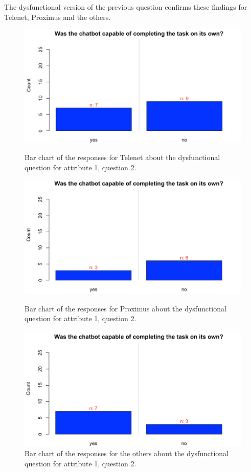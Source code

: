 The dysfunctional version of the previous question confirms these findings for Telenet, Proximus and the others.\\
\begin{figure}[!htb]
	\includegraphics[width=\linewidth]{../LaTeX/Figures/Comparative/DQ1Tb.png}
	\caption{Bar chart of the responses for Telenet about the dysfunctional question for attribute 1, question 2.}\label{fig:DQ1Tb}
	\endminipage\hfill
	\includegraphics[width=\linewidth]{../LaTeX/Figures/Comparative/DQ1Pb.png}
	\caption{Bar chart of the responses for Proximus about the dysfunctional question for attribute 1, question 2.}\label{fig:DQ1Pb}
	\endminipage\hfill
	\includegraphics[width=\linewidth]{../LaTeX/Figures/Comparative/DQ1Ob.png}
	\caption{Bar chart of the responses for the others about the dysfunctional question for attribute 1, question 2.}\label{fig:DQ1Ob}
	\endminipage\hfill
\end{figure}
